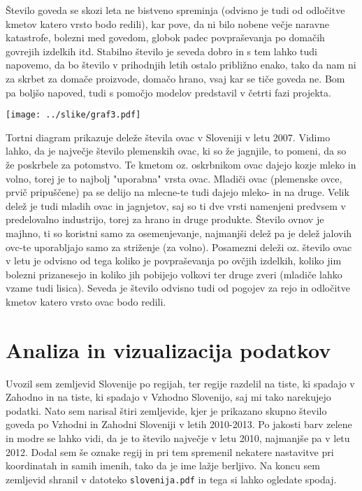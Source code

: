 \documentclass[11pt,a4paper]{article}
\begin{document}
\newline
Število goveda se skozi leta ne bistveno spreminja (odvisno je tudi od odločitve kmetov katero vrsto bodo redili), kar pove, da ni bilo nobene večje naravne katastrofe, bolezni med govedom, globok padec povpraševanja po domačih govrejih izdelkih itd. Stabilno število je seveda dobro in s tem lahko tudi napovemo, da bo število v prihodnjih letih ostalo približno enako, tako da nam ni za skrbet za domače proizvode, domačo hrano, vsaj kar se tiče goveda ne. Bom pa boljšo napoved, tudi s pomočjo modelov predstavil v četrti fazi projekta.

\texttt{[image: ../slike/graf3.pdf]}

\noindent Tortni diagram prikazuje deleže števila ovac v Sloveniji v letu 2007. Vidimo lahko, da je največje število plemenskih ovac, ki so že jagnjile, to pomeni, da so že poskrbele za potomstvo. Te kmetom oz. oskrbnikom ovac dajejo kozje mleko in volno, torej je to najbolj "uporabna" vrsta ovac. Mladiči ovac (plemenske ovce, prvič pripuščene) pa se delijo na mlecne-te tudi dajejo mleko- in na druge. Velik delež je tudi mladih ovac in jagnjetov, saj so ti dve vrsti namenjeni predvsem v predelovalno industrijo, torej za hrano in druge produkte. Število ovnov je majhno, ti so koristni samo za osemenjevanje, najmanjši delež pa je delež jalovih ovc-te uporabljajo samo za striženje (za volno). Posamezni deleži oz. število ovac v letu je odvisno od tega koliko je povpraševanja po ovčjih izdelkih, koliko jim bolezni prizanesejo in koliko jih pobijejo volkovi ter druge zveri (mladiče lahko vzame tudi lisica). Seveda je število odvisno tudi od pogojev za rejo in odločitve kmetov katero vrsto ovac bodo redili.


\newpage
\section{Analiza in vizualizacija podatkov}
Uvozil sem zemljevid Slovenije po regijah, ter regije razdelil na tiste, ki spadajo v Zahodno in na tiste, ki spadajo v Vzhodno Slovenijo, saj mi tako narekujejo podatki. Nato sem narisal štiri zemljevide, kjer je prikazano skupno število goveda po Vzhodni in Zahodni Sloveniji v letih 2010-2013. Po jakosti barv zelene in modre se lahko vidi, da je to število največje v letu 2010, najmanjše pa v letu 2012. Dodal sem še oznake regij in pri tem spremenil nekatere nastavitve pri koordinatah in samih imenih, tako da je ime lažje berljivo. Na koncu sem zemljevid shranil v datoteko \verb|slovenija.pdf| in tega si lahko ogledate spodaj.
\end{document}
